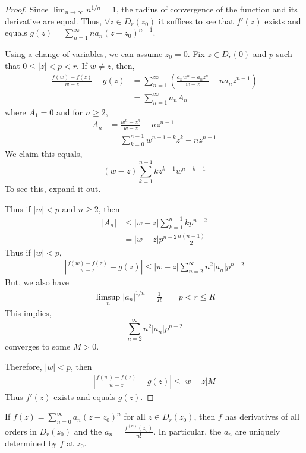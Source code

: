 \documentclass[12pt]{amsart}
\begin{document}
\begin{proof}
    Since $\lim_{n \to \infty} n^{1/n} = 1$, the radius of convergence of the function and its derivative are equal. Thus, $\forall z \in D_r(z_0)$ it suffices to see that $f'(z)$ exists and equals $g(z) = \sum_{n=1}^\infty na_n(z-z_0)^{n-1}$. 

    Using a change of variables, we can assume $z_0 = 0$. Fix $z \in D_r(0)$ and $p$ such that $0 \leq |z| < p < r$. If $w \neq z$, then, 
    \begin{align*}
        \frac{f(w)-f(z)}{w-z} -g(z) &= \sum_{n = 1}^\infty \left(\frac{a_nw^n - a_nz^n}{w-z} - na_nz^{n-1} \right)\\
        &= \sum_{n=1}^\infty a_nA_n
    \end{align*}
    where $A_1 = 0$ and for $n \geq 2$, 
    \begin{align*}
        A_n &= \frac{w^n -z^n}{w-z} - nz^{n-1} \\
        &= \sum_{k=0}^{n-1} w^{n-1-k}z^k - nz^{n-1}
    \end{align*}
    We claim this equals, 
    \[ (w-z) \sum_{k=1}^{n-1} kz^{k-1}w^{n-k-1}\]
    To see this, expand it out. 

    Thus if $|w| < p$ and $n \geq 2$, then 
    \begin{align*}
        |A_n| &\leq |w-z| \sum_{k=1}^{n-1} kp^{n-2} \\
        &= |w-z| p^{n-2}\frac{n(n-1)}{2}
    \end{align*}
    Thus if $|w| < p$, 
    \begin{align*}
        \left| \frac{f(w) - f(z)}{w-z} -g(z) \right| \leq |w-z| \sum_{n=2}^{\infty} n^2 |a_n| p^{n-2}
    \end{align*}
    But, we also have
    \begin{align*}
        \limsup_n |a_n|^{1/n} = \frac{1}{R} \qquad p < r \leq R
    \end{align*}
    This implies, 
    \[ \sum_{n=2}^\infty n^2 |a_n|p^{n-2}\]
    converges to some $M > 0$. 

    Therefore, $|w| < p$, then 
    \begin{align*}
        \left| \frac{f(w) -f(z)}{w-z} - g(z)\right| \leq |w-z|M
    \end{align*}
    Thus $f'(z)$ exists and equals $g(z)$. 
\end{proof}


\begin{corollary}[W 2.7]
    If $f(z) = \sum_{n=0}^\infty a_n(z-z_0)^n$ for all $z \in D_r(z_0)$, then $f$ has derivatives of all orders in $D_r(z_0)$ and the $a_n = \frac{f^{(n)}(z_0)}{n!}$. In particular, the $a_n$ are uniquely determined by $f$ at $z_0$. 
\end{corollary}
\end{document}
